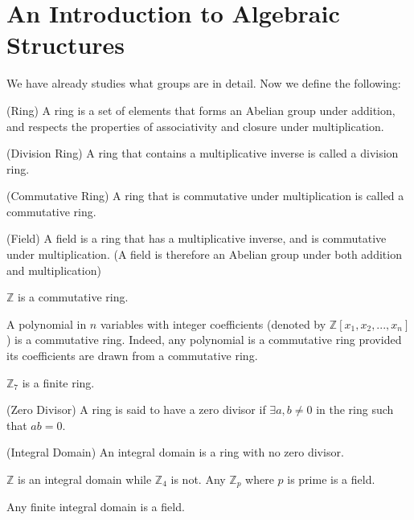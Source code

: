 \section{An Introduction to Algebraic Structures}
We have already studies what groups are in detail. Now we define the following:
\begin{definition} (Ring)
A ring is a set of elements that forms an Abelian group under addition, and respects the properties of associativity and closure under multiplication.
\end{definition}
\begin{definition} (Division Ring)
A ring that contains a multiplicative inverse is called a division ring.
\end{definition}
\begin{definition} (Commutative Ring)
A ring that is commutative under multiplication is called a commutative ring.
\end{definition}
\begin{definition} (Field)
A field is a ring that has a multiplicative inverse, and is commutative under multiplication. (A field is therefore an Abelian group under both addition and multiplication)
\end{definition}
\begin{example}
$\mathbb{Z}$ is a commutative ring.
\end{example}
\begin{example}
A polynomial in $n$ variables with integer coefficients (denoted by $\mathbb{Z}[x_1,x_2,...,x_n]$) is a commutative ring. Indeed, any polynomial is a commutative ring provided its coefficients are drawn from a commutative ring.
\end{example}
\begin{example}
$\mathbb{Z}_7$ is a finite ring.\\
\end{example}
\begin{definition} (Zero Divisor)
A ring is said to have a zero divisor if $\exists a,b \neq 0$ in the ring such that $ab = 0$.
\end{definition}
\begin{definition} (Integral Domain)
An integral domain is a ring with no zero divisor.
\end{definition}
\begin{example}
$\mathbb{Z}$ is an integral domain while $\mathbb{Z}_4$ is not. Any $\mathbb{Z}_p$ where $p$ is prime is a field.
\end{example}
\begin{theorem}
Any finite integral domain is a field.
\end{theorem}

